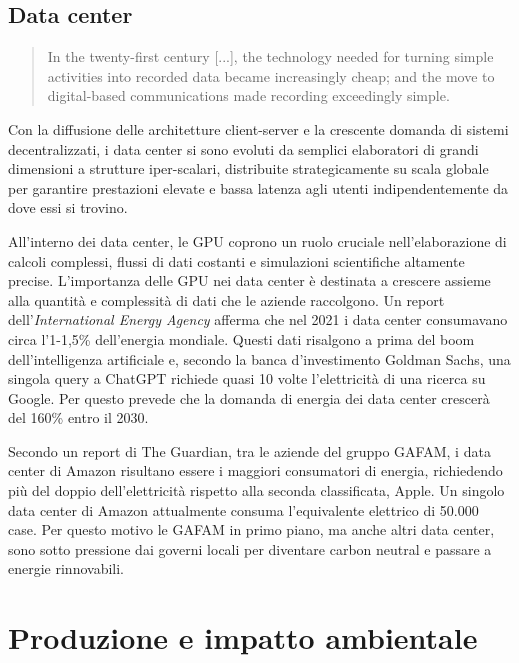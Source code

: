 \documentclass[12pt,a4paper,oneside]{book}
\begin{document}
\subsection{Data center}

\begin{quote}
\small
In the twenty-first century [...], the technology needed for turning simple activities into recorded data became increasingly cheap; and the move to digital-based communications made recording exceedingly simple.\citep[p.28]{srnicek2017platform}
\end{quote}

Con la diffusione delle architetture client-server e la crescente domanda di sistemi decentralizzati, i data center si sono evoluti da semplici elaboratori di grandi dimensioni a strutture iper-scalari, distribuite strategicamente su scala globale per garantire prestazioni elevate e bassa latenza agli utenti indipendentemente da dove essi si trovino.

All'interno dei data center, le GPU coprono un ruolo cruciale nell'elaborazione di calcoli complessi, flussi di dati  costanti e simulazioni scientifiche altamente precise. L'importanza delle GPU nei data center è destinata a crescere assieme alla quantità e complessità di dati che le aziende raccolgono. Un report dell'\textit{International Energy Agency} afferma che nel 2021 i data center consumavano circa l'1-1,5\% dell'energia mondiale. Questi dati risalgono a prima del boom dell'intelligenza artificiale e, secondo la banca d'investimento Goldman Sachs, una singola query a ChatGPT richiede quasi 10 volte l'elettricità di una ricerca su Google. Per questo prevede che la domanda di energia dei data center crescerà del 160\% entro il 2030.

Secondo un report di The Guardian\cite{guardian2024datacenters}, tra le aziende del gruppo GAFAM, i data center di Amazon risultano essere i maggiori consumatori di energia, richiedendo più del doppio dell'elettricità rispetto alla seconda classificata, Apple. Un singolo data center di Amazon attualmente consuma l'equivalente elettrico di 50.000 case. Per questo motivo le GAFAM in primo piano, ma anche altri data center, sono sotto pressione dai governi locali per diventare carbon neutral e passare a energie rinnovabili.

\section{Produzione e impatto ambientale}
\end{document}
